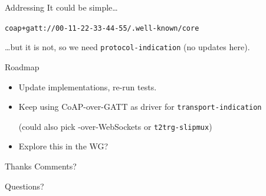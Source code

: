 \documentclass[aspectratio=169,colorlinks]{beamer}
\begin{document}
\begin{frame}{Addressing}\Large
	It could be simple\ldots

	\texttt{coap+gatt://00-11-22-33-44-55/.well-known/core}
	
	\bigskip

	\ldots but it is not, so we need \texttt{protocol-indication} (no updates here).
\end{frame}

\begin{frame}{Roadmap}\Large
	\begin{itemize}
		\item Update implementations, re-run tests.

		\item Keep using CoAP-over-GATT as driver for \texttt{transport-indication}

			(could also pick -over-WebSockets or \texttt{t2trg-slipmux})
		\item Explore this in the WG?
	\end{itemize}
\end{frame}

\begin{frame}{Thanks}\Large
	Comments?

	\bigskip

	Questions?
\end{frame}
\end{document}
